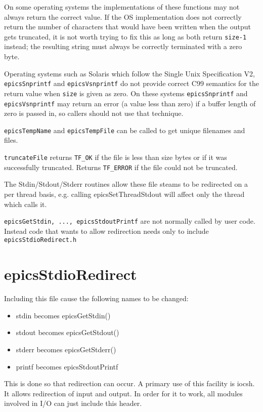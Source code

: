 On some operating systems the implementations of these functions may not always return the correct value. If the OS 
implementation does not correctly return the number of characters that would have been written when the output gets 
truncated, it is not worth trying to fix this as long as both return \verb|size-1| instead; the resulting string must always be 
correctly terminated with a zero byte.

Operating systems such as Solaris which follow the Single Unix Specification V2, \verb|epicsSnprintf| and 
\verb|epicsVsnprintf| do not provide correct C99 semantics for the return value when \verb|size| is given as zero.  On these 
systems \verb|epicsSnprintf| and \verb|epicsVsnprintf| may return an error (a value less than zero) if a buffer length of 
zero is passed in, so callers should not use that technique.

\verb|epicsTempName| and \verb|epicsTempFile| can be called to get unique filenames and files.

\verb|truncateFile| returns \verb|TF_OK| if the file is less than size bytes or if it was successfully truncated. Returns \verb|TF_ERROR| 
if the file could not be truncated. 

The Stdin/Stdout/Stderr routines allow these file steams to be redirected on a per thread basis, e.g. calling 
epicsSetThreadStdout will affect only the thread which calls it.

\verb|epicsGetStdin, ..., epicsStdoutPrintf| are not normally called by user code. Instead code that wants to 
allow redirection needs only to include \verb|epicsStdioRedirect.h|

\section{epicsStdioRedirect}

Including this file cause the following names to be changed:

\begin{itemize}\item stdin becomes  epicsGetStdin()

\item stdout becomes epicsGetStdout()

\item stderr becomes epicsGetStderr()

\item printf becomes epicsStdoutPrintf

\end{itemize}This is done so that redirection can occur. A primary use of this facility is iocsh. It allows redirection of input and output. 
In order for it to work, all modules involved in I/O can just include this header.

